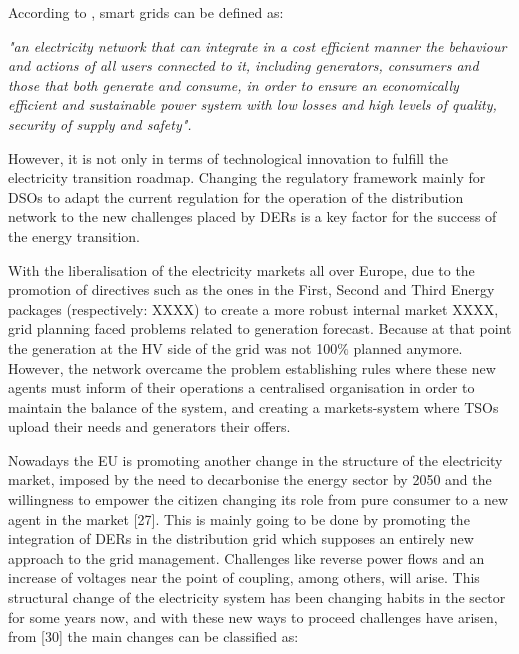 According to \cite{EuropeanParliamentSG}, smart grids can be defined as:

\begin{tcolorbox}
\textit{"an electricity network that can integrate in a cost efficient manner the behaviour and actions of all users connected to it, including generators, consumers and those that both generate and consume, in order to ensure an economically efficient and sustainable power system with low losses and high levels of quality, security of supply and safety".} 
\end{tcolorbox}

However, it is not only in terms of technological innovation to fulfill the electricity transition roadmap. Changing the regulatory framework mainly for DSOs to adapt the current regulation for the operation of the distribution network to the new challenges placed by DERs is a key factor for the success of the energy transition.

With the liberalisation of the electricity markets all over Europe, due to the promotion of directives such as the ones in the First, Second and Third Energy packages (respectively: XXXX) to create a more robust internal market XXXX, grid planning faced problems related to generation forecast. Because at that point the generation at the HV side of the grid was not 100$\%$ planned anymore. However, the network overcame the problem establishing rules where these new agents must inform of their operations a centralised organisation in order to maintain the balance of the system, and creating a markets-system where TSOs upload their needs and generators their offers. 

Nowadays the EU is promoting another change in the structure of the electricity market, imposed by the need to decarbonise the energy sector by 2050 and the willingness to empower the citizen changing its role from pure consumer to a new agent in the market [27]. This is mainly going to be done by promoting the integration of DERs in the distribution grid which supposes an entirely new approach to the grid management. Challenges like reverse power flows and an increase of voltages near the point of coupling, among others, will arise. This structural change of the electricity system has been changing habits in the sector for some years now, and with 
these new ways to proceed challenges have arisen, from [30] the main changes can be classified as:

